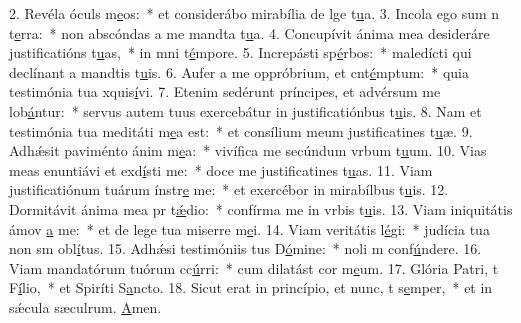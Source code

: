 2. Revéla óculs m\uline{e}os:~* et considerábo mirabília de lge t\uline{u}a.
3. Incola ego sum n t\uline{e}rra:~* non abscóndas a me mandta t\uline{u}a.
4. Concupívit ánima mea desideráre justificatións t\uline{u}as,~* in mni t\uline{é}mpore.
5. Increpásti sp\uline{é}rbos:~* maledícti qui declínant a mandtis t\uline{u}is.
6. Aufer a me oppróbrium, et cnt\uline{é}mptum:~* quia testimónia tua xquis\uline{í}vi.
7. Etenim sedérunt príncipes, et advérsum me lob\uline{á}ntur:~* servus autem tuus exercebátur in justificatiónbus t\uline{u}is.
8. Nam et testimónia tua meditáti m\uline{e}a est:~* et consílium meum justificatines t\uline{u}æ.
9. Adhǽsit paviménto ánim m\uline{e}a:~* vivífica me secúndum vrbum t\uline{u}um.
10. Vias meas enuntiávi et exd\uline{í}sti me:~* doce me justificatines t\uline{u}as.
11. Viam justificatiónum tuárum ínstr\uline{e} me:~* et exercébor in mirabílbus t\uline{u}is.
12. Dormitávit ánima mea pr t\uline{ǽ}dio:~* confírma me in vrbis t\uline{u}is.
13. Viam iniquitátis ámov \uline{a} me:~* et de lege tua miserre m\uline{e}i.
14. Viam veritátis l\uline{é}gi:~* judícia tua non sm obl\uline{í}tus.
15. Adhǽsi testimóniis tus D\uline{ó}mine:~* noli m conf\uline{ú}ndere.
16. Viam mandatórum tuórum cc\uline{ú}rri:~* cum dilatást cor m\uline{e}um.
17. Glória Patri, t F\uline{í}lio,~* et Spiríti S\uline{a}ncto.
18. Sicut erat in princípio, et nunc, t s\uline{e}mper,~* et in sǽcula sæculrum. \uline{A}men.

